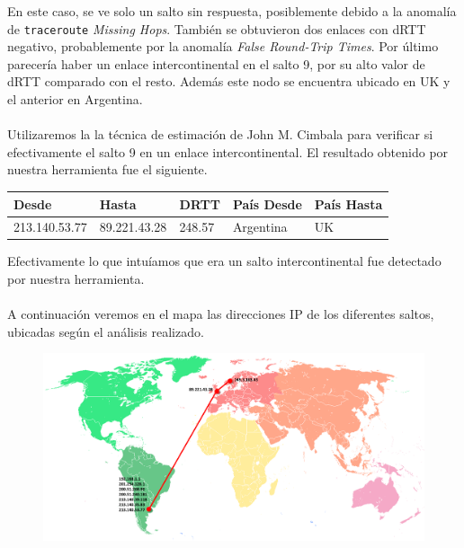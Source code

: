 En este caso, se ve solo un salto sin respuesta, posiblemente debido a la anomalía de \texttt{traceroute} \emph{Missing Hops}. También se obtuvieron dos enlaces con dRTT negativo, probablemente por la anomalía \emph{False Round-Trip Times}.
Por último parecería haber un enlace intercontinental en el salto 9, por su alto valor de dRTT comparado con el resto. Además este nodo se encuentra ubicado en UK y el anterior en Argentina.
\\\\
Utilizaremos la la técnica de estimación de John M. Cimbala para verificar si efectivamente el salto 9 en un enlace intercontinental.  
El resultado obtenido por nuestra herramienta fue el siguiente.

\begin{center}
    \begin{tabular}{| l | l | l | l | l | }
    \hline
    Desde                & Hasta                  & DRTT    & País Desde     & País Hasta    \\ \hline
    213.140.53.77   & 89.221.43.28       & 248.57   &   Argentina            &  UK               \\ \hline
  \end{tabular}
\end{center}

Efectivamente lo que intuíamos que era un salto intercontinental fue detectado por nuestra herramienta.
\\\\
A continuación veremos en el mapa las direcciones IP de los diferentes saltos, ubicadas según el análisis realizado.

\FloatBarrier

\begin{figure}[ht!]
  \centering
   \includegraphics[width=1.0\textwidth]{imagenes/mapaNOR.png}
\end{figure}

\FloatBarrier